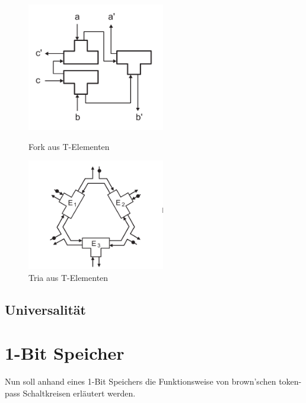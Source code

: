 \begin{figure}[h]
     \begin{minipage}{0.45\textwidth}
        \centering
        \includegraphics[width=6cm]{bilder/TP_Fork.png}
        \caption{Fork aus T-Elementen}
    \end{minipage}\hfill
     \begin{minipage}{0.45\textwidth}
        \centering
        \includegraphics[width=6cm]{bilder/TP_Tria.png}
        \caption{Tria aus T-Elementen}
    \end{minipage}\hfill
\end{figure}    

\subsection{Universalität}

\section{1-Bit Speicher}
Nun soll anhand eines 1-Bit Speichers die Funktionsweise von brown'schen 
token-pass Schaltkreisen erläutert werden. 

